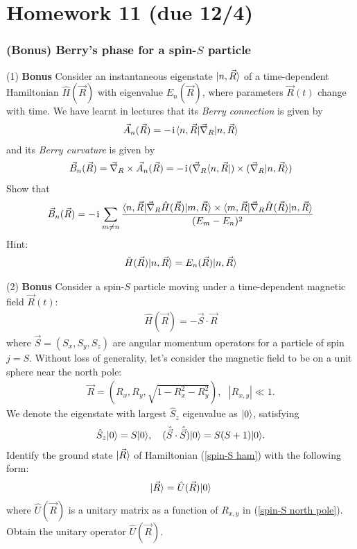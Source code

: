 \chapter{Homework 11 (due 12/4)}

\subsection{(Bonus) Berry's phase for a spin-$S$ particle}

(1) \textbf{Bonus}  Consider an instantaneous eigenstate $|{n,\vec R}\rangle$ of a time-dependent Hamiltonian $\hat H(\vec R)$ with eigenvalue $E_n(\vec R)$, where parameters $\vec R(t)$ change with time. We have learnt in lectures that its \emph{Berry connection} is given by
\begin{align}
\vec A_n(\vec R)=-\hspace{1pt}\mathrm{i}\hspace{1pt}\langle{n,\vec R|\vec\nabla_R|n,\vec R}\rangle
\end{align}
and its \emph{Berry curvature} is given by
\begin{align}
\vec B_n(\vec R)=\vec\nabla_R\times\vec A_n(\vec R)=-\hspace{1pt}\mathrm{i}\hspace{1pt}(\vec\nabla_R\langle{n,\vec R|)\times(\vec\nabla_R|n,\vec R}\rangle)
\end{align}
Show that 
\begin{align}
\vec B_n(\vec R)=-\hspace{1pt}\mathrm{i}\hspace{1pt}\sum_{m\neq n}\frac{\langle{n,\vec R|\vec\nabla_R\hat H(\vec R)|m,\vec R}\rangle\times\langle{m,\vec R|\vec\nabla_R\hat H(\vec R)|n,\vec R}\rangle}{(E_m-E_n)^2}
\end{align}
Hint:
\begin{align}
\hat H(\vec R)|{n,\vec R}\rangle=E_n(\vec R)|{n,\vec R}\rangle
\end{align}


(2) \textbf{Bonus} Consider a spin-$S$ particle moving under a time-dependent magnetic field $\vec R(t)$:
\begin{align}\label{spin-S ham}
\hat H(\vec R)=-\vec S\cdot\vec R
\end{align}
where $\vec S=(S_x,S_y,S_z)$ are angular momentum operators for a particle of spin $j=S$. Without loss of generality, let's consider the magnetic field to be on a unit sphere near the north pole:
\begin{align}\label{spin-S north pole}
\vec R=(R_x,R_y,\sqrt{1-R_x^2-R_y^2}),~~~|R_{x,y}|\ll1.
\end{align}
We denote the eigenstate with largest $\hat S_z$ eigenvalue as $|{0}\rangle$, satisfying
\begin{align}
\hat S_z|{0}\rangle=S|{0}\rangle,~~~(\hat{\vec S}\cdot\hat{\vec S})|{0}\rangle=S(S+1)|{0}\rangle.
\end{align}
Identify the ground state $|{\vec R}\rangle$ of Hamiltonian (\ref{spin-S ham}) with the following form:
\begin{align}
|{\vec R}\rangle=\hat U(\vec R)|{0}\rangle
\end{align}
where $\hat U(\vec R)$ is a unitary matrix as a function of $R_{x,y}$ in (\ref{spin-S north pole}). Obtain the unitary operator $\hat U(\vec R)$. 

